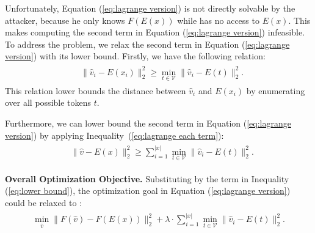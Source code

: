 Unfortunately,  Equation (\ref{eq:lagrange version}) is not directly solvable by the attacker, because he only knows $F(E(x))$ while has no access to $E(x)$. This makes computing the second term in Equation (\ref{eq:lagrange version}) infeasible. To address the problem,  we relax the second term in Equation (\ref{eq:lagrange version}) with its lower bound. Firstly, we have the following relation: 
\begin{align}
\label{eq:lagrange each term}
\begin{aligned}
    &  \| \hat{v}_i- E(x_i) \|_2^2\ge \min_{t \in \mathcal{V}} \|\hat{v}_i -E(t) \|_2^2.
\end{aligned}
\end{align}
This relation lower bounds the distance between $\hat{v}_i$ and $E(x_i)$ by enumerating over all possible tokens $t$.

Furthermore, we can lower bound the second term in Equation (\ref{eq:lagrange version}) by applying Inequality~(\ref{eq:lagrange each term}):\\
\begin{align}
\label{eq:lower bound}
\begin{aligned}
    &  \| \hat{v}- E(x) \|_2^2\ge \sum_{i=1}^{|x|} \min_{t \in \mathcal{V}} \|\hat{v}_i -E(t) \|_2^2.
\end{aligned}
\end{align}




\noindent \textbf{Overall Optimization Objective.} Substituting by the term in Inequality (\ref{eq:lower bound}), the optimization goal in Equation (\ref{eq:lagrange version}) could be relaxed to :
\begin{align}
\label{eq:whole lagrange practical version}
\begin{aligned}
    \min_{\hat{v}}  \| F(\hat{v})-F(E(x)) \|_2^2+ \lambda \cdot \sum_{i=1}^{|x|} \min_{t \in \mathcal{V}} \|\hat{v}_i -E(t) \|_2^2.
\end{aligned}
\end{align}

